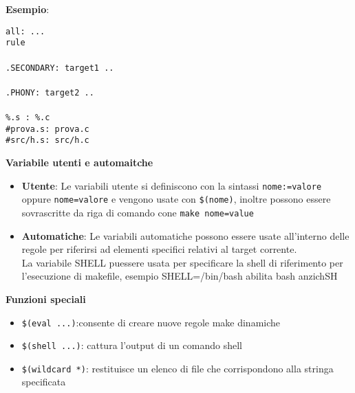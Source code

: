 \begin{flushleft}
\begin{flushleft}
\begin{flushleft}
      \textbf{Esempio}:
      \begin{flushleft}
        \texttt{all: ... \\ 
                \tab rule \\ 
                \tab \\ 
                .SECONDARY: target1 .. \\
                \tab \\
                .PHONY: target2 ..\\
                \tab \\ 
                \%.s : \%.c \\ 
                \tab \#prova.s: prova.c \\
                \tab \#src/h.s: src/h.c} 
      \end{flushleft}
    \end{flushleft}
    \begin{flushleft}
      \textbf{Variabile utenti e automaitche}\par 
      \begin{itemize}
        \item \textbf{Utente}: Le variabili utente si definiscono con la sintassi 
              \texttt{nome:=valore} oppure \texttt{nome=valore} e vengono usate 
              con \texttt{\$(nome)}, inoltre possono essere sovrascritte da riga di 
              comando cone \texttt{make nome=value}
        \item \textbf{Automatiche}: Le variabili automatiche possono essere usate all'interno 
              delle regole per riferirsi ad elementi specifici relativi al target corrente. \\
              La variabile SHELL pu\aco essere usata per specificare la shell di riferimento 
              per l'esecuzione di makefile, esempio SHELL=/bin/bash abilita bash anzich\ace SH
      \end{itemize}
    \end{flushleft}
    \begin{flushleft}
      \textbf{Funzioni speciali}\\
      \begin{itemize}
        \item \texttt{\$(eval ...)}:consente di creare nuove regole make dinamiche
        \item \texttt{\$(shell ...)}: cattura l'output di un comando shell
        \item \texttt{\$(wildcard *)}: restituisce un elenco di file che corrispondono alla stringa specificata

\end{itemize}
\end{flushleft}
\end{flushleft}
\end{flushleft}
